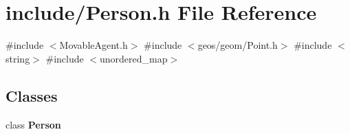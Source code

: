 \section{include/\+Person.h File Reference}
\label{_person_8h}
{\ttfamily \#include $<$Movable\+Agent.\+h$>$}\newline
{\ttfamily \#include $<$geos/geom/\+Point.\+h$>$}\newline
{\ttfamily \#include $<$string$>$}\newline
{\ttfamily \#include $<$unordered\+\_\+map$>$}\newline
\subsection*{Classes}
\begin{DoxyCompactItemize}
\item 
class \textbf{ Person}
\end{DoxyCompactItemize}
